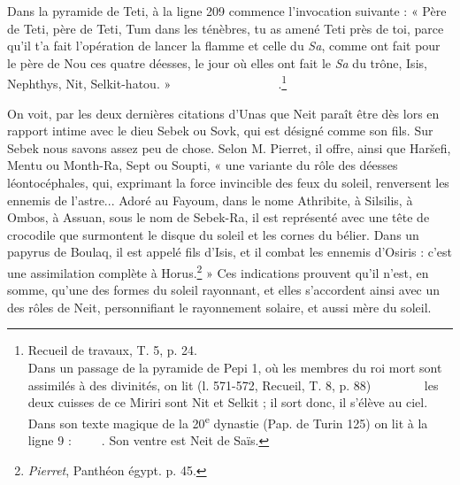 \documentclass[letterpaper,twocolumn,openany,nodeprecatedcode]{dndbook}
\newcommand*\hieroAAAD{}
\newcommand*\hieroAAAG{}
\newcommand*\hieroAAAH{}
\newcommand*\hieroAAAO{}
\newcommand*\hieroAAAQ{}
\newcommand*\hieroAAAW{\raisebox{0.5ex}{}}
\newcommand*\hieroAABR{}
\newcommand*\hieroAACB{\raisebox{0.5ex}{}}
\newcommand*\hieroAACI{}
\newcommand*\hieroAACM{}
\newcommand*\hieroAACN{\raisebox{1ex}{}}
\newcommand*\hieroAACS{}
\newcommand*\hieroAAEK{}
\newcommand*\hieroAAEX{}
\newcommand*\hieroAAEZ{}
\newcommand*\hieroAAFN{\raisebox{0.5ex}{}}
\newcommand*\hieroAAFS{}
\newcommand*\hieroAAHE{}
\newcommand*\hieroAAIA{\raisebox{0.3ex}{}}
\newcommand*\hieroAAIS{}
\newcommand*\hieroAAKN{}
\newcommand*\hieroAALA{}
\newcommand*\hieroAAPC{\raisebox{0.5ex}{}}
\newcommand*\hieroAAPY{}
\newcommand*\hieroAASD{}
\newcommand*\hieroAASG{}
\newcommand*\hieroAAUA{}
\newcommand*\hieroAAUB{}
\newcommand*\hieroAAUC{}
\newcommand*\hieroAAUD{}
\newcommand*\hieroAAUE{}
\newcommand*\hieroAAUF{}
\newcommand*\hieroAAUG{}
\newcommand*\hieroAAUH{}
\newcommand*\hieroAAUI{}
\newcommand*\hieroAAUJ{}
\newcommand*\hieroAAUK{}
\newcommand*\hieroAAUL{}
\newcommand*\hieroAAUM{}
\newcommand*\hieroAAUN{}
\newcommand*\hieroAAUO{}
\newcommand*\hieroAAUP{}
\newcommand*\hieroAAUQ{}
\newcommand*\hieroAAUR{}
\newcommand*\hieroAAUS{}
\newcommand*\hieroAAUT{}
\begin{document}
Dans la pyramide de Teti, à la ligne 209 commence l'invocation suivante : « Père de Teti, père de Teti, Tum dans les ténèbres, tu as amené Teti près de toi, parce qu’il t'a fait l'opération de lancer la flamme et celle du \emph{Sa}, comme ont fait pour le père de Nou ces quatre déesses, le jour où elles ont fait le \emph{Sa} du trône, Isis, Nephthys, Nit, Selkit-hatou. » $\hieroAAIS\:\hieroAAUA\:\hieroAAAG\allowbreak\:\hieroAAUB\:\hieroAAUC\:\hieroAACM\:\hieroAAUD\:\hieroAAUE\:\hieroAAAH\allowbreak\:\hieroAAHE\:\hieroAACM\:\hieroAAIA\:\hieroAAEK\:\hieroAASG\:\hieroAALA\allowbreak\:\hieroAALA\:\hieroAALA\:\hieroAAUF\:\hieroAACM\:\hieroAAUG\:\hieroAAAG\allowbreak\:\hieroAACN\:\hieroAACS\:\hieroAACN\:\hieroAAUH\:\hieroAAUI\:\hieroAAUJ\allowbreak\:\hieroAAFS\:\hieroAAUK\:\hieroAAAQ\:\hieroAACI\:\hieroAACS\:\hieroAAUL\allowbreak\:\hieroAAEZ\:\hieroAACB\:\hieroAACM\allowbreak\:\hieroAAUM\:\hieroAACI$.\footnote{Recueil de travaux, T. 5, p. 24.\\\hspace*{5mm}Dans un passage de la pyramide de Pepi 1, où les membres du roi mort sont assimilés à des divinités, on lit (l. 571-572, Recueil, T. 8, p. 88) $\hieroAAUN\:\hieroAAPY\:\hieroAAPY\allowbreak\:\hieroAAUO\:\hieroAABR\:\hieroAAAQ\:\hieroAAAO\:\hieroAAEZ\:\hieroAAKN\allowbreak\:\hieroAAUP\:\hieroAAUQ\:\hieroAAAH\:\hieroAAAH\:\hieroAAUR\:\hieroAAAH\allowbreak\:\hieroAAUS\:\hieroAAPC$ les deux cuisses de ce Miriri sont Nit et Selkit ; il sort donc, il s'élève au ciel.\\\hspace*{5mm}Dans son texte magique de la 20\textsuperscript{e} dynastie (Pap. de Turin 125) on lit à la ligne 9 : $\hieroAAUT\:\hieroAAFN\:\hieroAASD\allowbreak\:\hieroAAEX\:\hieroAALA\:\hieroAAAD\allowbreak\:\hieroAAAG\:\hieroAAAH\allowbreak\:\hieroAAAH\:\hieroAAAW$. Son ventre est Neit de Saïs.}

On voit, par les deux dernières citations d'Unas que Neit paraît être dès lors en rapport intime avec le dieu Sebek ou Sovk, qui est désigné comme son fils. Sur Sebek nous savons assez peu de chose. Selon M. Pierret, il offre, ainsi que Haršefi, Mentu ou Month-Ra, Sept ou Soupti, « une variante du rôle des déesses léontocéphales, qui, exprimant la force invincible des feux du soleil, renversent les ennemis de l'astre... Adoré au Fayoum, dans le nome Athribite, à Silsilis, à Ombos, à Assuan, sous le nom de Sebek-Ra, il est représenté avec une tête de crocodile que surmontent le disque du soleil et les cornes du bélier. Dans un papyrus de Boulaq, il est appelé fils d'Isis, et il combat les ennemis d'Osiris : c'est une assimilation complète à Horus.\footnote{\emph{Pierret}, Panthéon égypt. p. 45.} » Ces indications prouvent qu'il n'est, en somme, qu'une des formes du soleil rayonnant, et elles s'accordent ainsi avec un des rôles de Neit, personnifiant le rayonnement solaire, et aussi mère du soleil.
\end{document}

